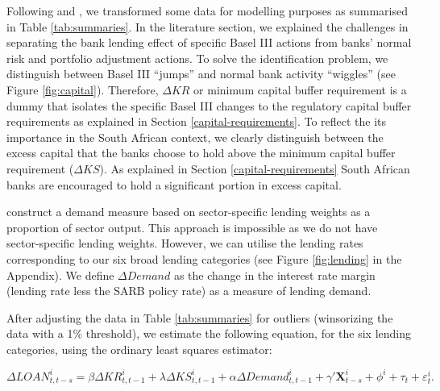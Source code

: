\documentclass[
]{article}
\begin{document}
Following \citet{fang2020bank} and \citet{aiyar2016does}, we transformed some data for modelling purposes as summarised in Table \ref{tab:summaries}. In the literature section, we explained the challenges in separating the bank lending effect of specific Basel III actions from banks' normal risk and portfolio adjustment actions. To solve the identification problem, we distinguish between Basel III ``jumps'' and normal bank activity ``wiggles'' (see Figure \ref{fig:capital}). Therefore, \(\Delta KR\) or minimum capital buffer requirement is a dummy that isolates the specific Basel III changes to the regulatory capital buffer requirements as explained in Section \ref{capital-requirements}. To reflect the its importance in the South African context, we clearly distinguish between the excess capital that the banks choose to hold above the minimum capital buffer requirement (\(\Delta KS\)). As explained in Section \ref{capital-requirements} South African banks are encouraged to hold a significant portion in excess capital.

\citet{fang2020bank} construct a demand measure based on sector-specific lending weights as a proportion of sector output. This approach is impossible as we do not have sector-specific lending weights. However, we can utilise the lending rates corresponding to our six broad lending categories (see Figure \ref{fig:lending} in the Appendix). We define \(\Delta Demand\) as the change in the interest rate margin (lending rate less the SARB policy rate) as a measure of lending demand.

After adjusting the data in Table \ref{tab:summaries} for outliers (winsorizing the data with a 1\% threshold), we estimate the following equation, for the six lending categories, using the ordinary least squares estimator:

\[
\Delta LOAN^i_{t, t-s} = \beta \Delta KR^i_{t, t-1} + \lambda \Delta KS^i_{t, t-1} + \alpha \Delta Demand^i_{t, t-1} + \gamma'  \pmb{X}^i_{t-s} + \phi^i + \tau_t + \varepsilon^i_t.
\]
\end{document}
